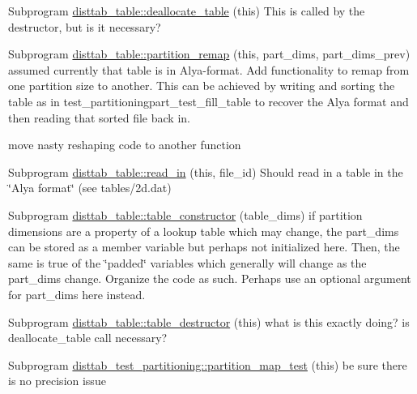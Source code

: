 
\begin{DoxyRefList}
\item[Subprogram \mbox{\hyperlink{namespacedisttab__table_ab8a2b8fd8aed669c2284a5b070f39492}{disttab\+\_\+table\+::deallocate\+\_\+table}} (this)]\label{todo__todo000005}%
%
This is called by the destructor, but is it necessary?  
\item[Subprogram \mbox{\hyperlink{namespacedisttab__table_a48241397777b4e586f1d9cf4389fae7d}{disttab\+\_\+table\+::partition\+\_\+remap}} (this, part\+\_\+dims, part\+\_\+dims\+\_\+prev)]\label{todo__todo000004}%
%
assumed currently that table is in Alya-\/format. Add functionality to remap from one partition size to another. This can be achieved by writing and sorting the table as in test\+\_\+partitioningpart\+\_\+test\+\_\+fill\+\_\+table to recover the Alya format and then reading that sorted file back in. 

move nasty reshaping code to another function  
\item[Subprogram \mbox{\hyperlink{namespacedisttab__table_a47c132f14609e77c6bd02ed429aaa515}{disttab\+\_\+table\+::read\+\_\+in}} (this, file\+\_\+id)]\label{todo__todo000003}%
%
Should read in a table in the \char`\"{}\+Alya format\char`\"{} (see tables/2d.\+dat)  
\item[Subprogram \mbox{\hyperlink{namespacedisttab__table_a51096402e00064f68a6c890b6c0d8500}{disttab\+\_\+table\+::table\+\_\+constructor}} (table\+\_\+dims)]\label{todo__todo000001}%
%
if partition dimensions are a property of a lookup table which may change, the part\+\_\+dims can be stored as a member variable but perhaps not initialized here. Then, the same is true of the \char`\"{}padded\char`\"{} variables which generally will change as the part\+\_\+dims change. Organize the code as such. Perhaps use an optional argument for part\+\_\+dims here instead.  
\item[Subprogram \mbox{\hyperlink{namespacedisttab__table_a00320b1b054be17b502e8bc01bdfb8cd}{disttab\+\_\+table\+::table\+\_\+destructor}} (this)]\label{todo__todo000002}%
%
what is this exactly doing? is deallocate\+\_\+table call necessary?  
\item[Subprogram \mbox{\hyperlink{namespacedisttab__test__partitioning_a9e95059f35b6a076292c47ebb6a31763}{disttab\+\_\+test\+\_\+partitioning\+::partition\+\_\+map\+\_\+test}} (this)]\label{todo__todo000006}%
%
be sure there is no precision issue 
\end{DoxyRefList}